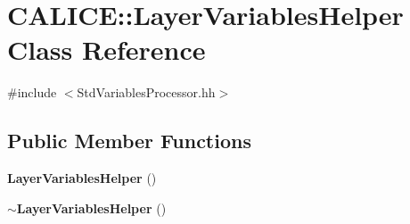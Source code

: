 \section{C\-A\-L\-I\-C\-E\-:\-:Layer\-Variables\-Helper Class Reference}
\label{classCALICE_1_1LayerVariablesHelper}


{\ttfamily \#include $<$Std\-Variables\-Processor.\-hh$>$}

\subsection*{Public Member Functions}
\begin{DoxyCompactItemize}
\item 
{\bf Layer\-Variables\-Helper} ()
\item 
{\bf $\sim$\-Layer\-Variables\-Helper} ()
\end{DoxyCompactItemize}
